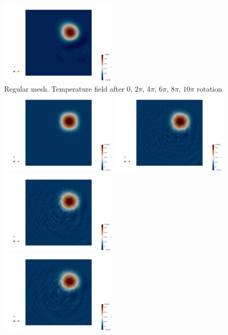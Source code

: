 \begin{center}
\includegraphics[width=5.6cm]{python_codes/fieldstone_45/results/norandom/T.0005.png}\\
{\captionfont Regular mesh. Temperature field after 0, $2\pi$, $4\pi$, $6\pi$, $8\pi$, $10\pi$ rotation}\\ 
\includegraphics[width=5.6cm]{python_codes/fieldstone_45/results/random/T.0000.png}
\includegraphics[width=5.6cm]{python_codes/fieldstone_45/results/random/T.0001.png}
\includegraphics[width=5.6cm]{python_codes/fieldstone_45/results/random/T.0002.png}\\
\includegraphics[width=5.6cm]{python_codes/fieldstone_45/results/random/T.0003.png}

\end{center}
